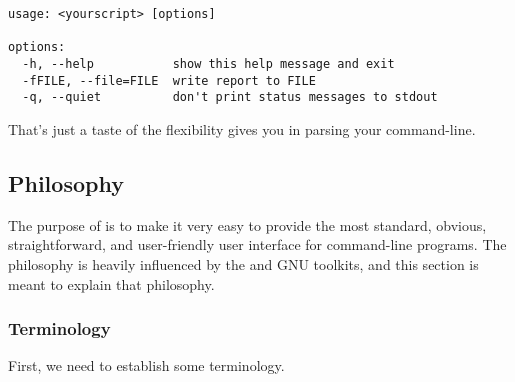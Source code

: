 \begin{verbatim}
usage: <yourscript> [options]

options:
  -h, --help           show this help message and exit
  -fFILE, --file=FILE  write report to FILE
  -q, --quiet          don't print status messages to stdout
\end{verbatim}

That's just a taste of the flexibility  gives you in
parsing your command-line.

\subsection{Philosophy\label{optparse-philosophy}}

The purpose of  is to make it very easy to provide the
most standard, obvious, straightforward, and user-friendly user
interface for \UNIX{} command-line programs.  The 
philosophy is heavily influenced by the \UNIX{} and GNU toolkits, and
this section is meant to explain that philosophy.

\subsubsection{Terminology\label{optparse-terminology}}

First, we need to establish some terminology.

